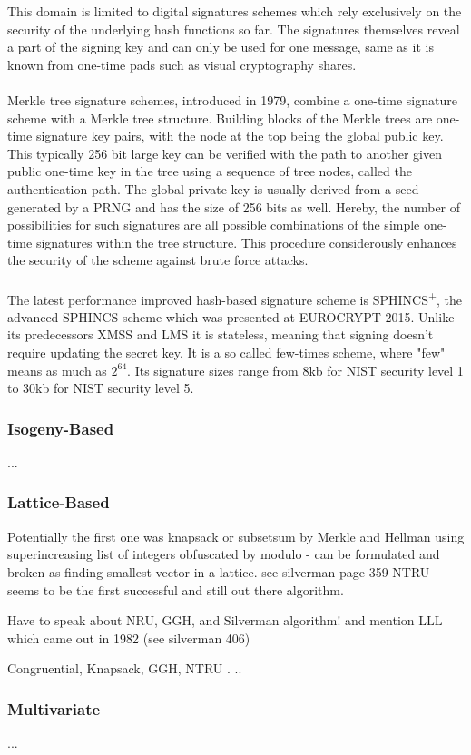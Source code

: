 \documentclass[a4paper,11pt]{article}
\begin{document}
\begin{multicols}{2}
This domain is limited to digital signatures schemes which rely exclusively on the security of the underlying hash functions so far. The signatures themselves reveal a part of the signing key and can only be used for one message, same as it is known from one-time pads such as visual cryptography shares. \\
\\
Merkle tree signature schemes, introduced in 1979, combine a one-time signature scheme with a Merkle tree structure. Building blocks of the Merkle trees are one-time signature key pairs, with the node at the top being the global public key. This typically 256 bit large key can be verified with the path to another given public one-time key in the tree using a sequence of tree nodes, called the authentication path. The global private key is usually derived from a seed generated by a PRNG and has the size of 256 bits as well.
Hereby, the number of possibilities for such signatures are all possible combinations of the simple one-time signatures within the tree structure. This procedure considerously enhances the security of the scheme against brute force attacks. \\
\\
The latest performance improved hash-based signature scheme is SPHINCS\textsuperscript{+}, the advanced SPHINCS scheme which was presented at EUROCRYPT 2015. Unlike its predecessors XMSS and LMS it is stateless, meaning that signing doesn't require updating the secret key. It is a so called few-times scheme, where "few" means as much as $2^{64}$. Its signature sizes range from 8kb for NIST security level 1 to 30kb for NIST security level 5.\\


\subsubsection{Isogeny-Based}
...

\subsubsection{Lattice-Based}
Potentially the first one was knapsack or subsetsum by Merkle and Hellman using superincreasing list of integers obfuscated by modulo  - can be formulated and broken as finding smallest vector in a lattice. see silverman page 359
NTRU seems to be the first successful and still out there algorithm.

Have to speak about NRU, GGH, and Silverman algorithm!  and mention LLL which came out in 1982 (see silverman 406)

Congruential, Knapsack, GGH, NTRU
.
..

\subsubsection{Multivariate}
...



\end{multicols}

 
\end{document}
